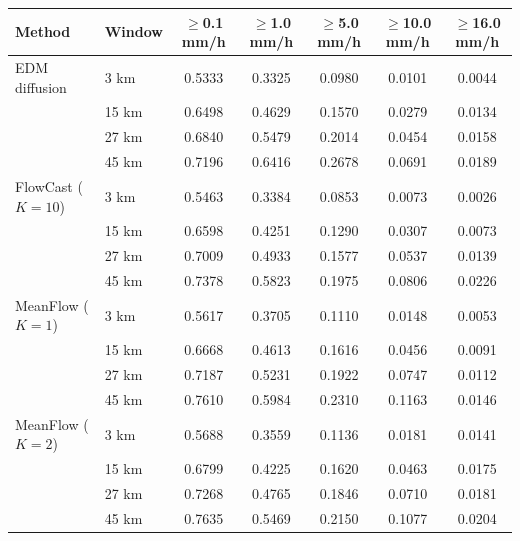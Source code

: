 \documentclass[border=10pt]{standalone}
\begin{document}
\begin{tabular}{llccccc}
\toprule
Method & Window & $\geq$0.1 mm/h & $\geq$1.0 mm/h & $\geq$5.0 mm/h & $\geq$10.0 mm/h & $\geq$16.0 mm/h \\
\midrule
EDM diffusion & 3 km & 0.5333 & 0.3325 & 0.0980 & 0.0101 & 0.0044 \\
 & 15 km & 0.6498 & 0.4629 & 0.1570 & 0.0279 & 0.0134 \\
 & 27 km & 0.6840 & 0.5479 & 0.2014 & 0.0454 & 0.0158 \\
 & 45 km & 0.7196 & 0.6416 & 0.2678 & 0.0691 & 0.0189 \\
FlowCast ($K{=}10$) & 3 km & 0.5463 & 0.3384 & 0.0853 & 0.0073 & 0.0026 \\
 & 15 km & 0.6598 & 0.4251 & 0.1290 & 0.0307 & 0.0073 \\
 & 27 km & 0.7009 & 0.4933 & 0.1577 & 0.0537 & 0.0139 \\
 & 45 km & 0.7378 & 0.5823 & 0.1975 & 0.0806 & 0.0226 \\
MeanFlow ($K{=}1$) & 3 km & 0.5617 & 0.3705 & 0.1110 & 0.0148 & 0.0053 \\
 & 15 km & 0.6668 & 0.4613 & 0.1616 & 0.0456 & 0.0091 \\
 & 27 km & 0.7187 & 0.5231 & 0.1922 & 0.0747 & 0.0112 \\
 & 45 km & 0.7610 & 0.5984 & 0.2310 & 0.1163 & 0.0146 \\
MeanFlow ($K{=}2$) & 3 km & 0.5688 & 0.3559 & 0.1136 & 0.0181 & 0.0141 \\
 & 15 km & 0.6799 & 0.4225 & 0.1620 & 0.0463 & 0.0175 \\
 & 27 km & 0.7268 & 0.4765 & 0.1846 & 0.0710 & 0.0181 \\
 & 45 km & 0.7635 & 0.5469 & 0.2150 & 0.1077 & 0.0204 \\
\bottomrule
\end{tabular}
\end{document}
